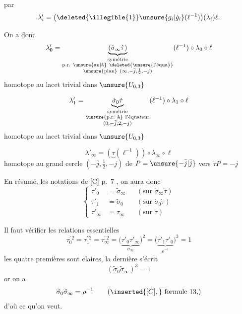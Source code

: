  par
\[
\lambda'_i=
\bigl(\deleted{\illegible{1}}\unsure{g_i|\dot g_i}(\ell^{-1})\bigr)
(\lambda_i)\ell.
\]

On a donc
\[
\lambda'_0=
\underbrace{(\dot\sigma_\infty\dot\tau)}_{
\substack{\text{symétrie}\\
\text{p.r. }\unsure{\text{au}|\text{à}}\ \deleted{\unsure{\text{l'équa}}}\\
\unsure{\text{plan}}\ (\infty,-\bar j,\frac12,-j)}}
(\ell^{-1})\circ\lambda_0\circ\ell
\]
 homotope au lacet trivial dans
$\unsure{U_{0,3}}$

\[
\lambda'_1=
\underbrace{\dot\sigma_0\dot\tau}_{
\substack{\text{symétrie}\\
\unsure{\text{p.r. à}}\ \text{l'équateur}\\
(0,-\bar j,2,-j)}}
(\ell^{-1})\circ\lambda_1\circ\ell
\]
homotope au lacet trivial dans $\unsure{U_{0,3}}$

\[
\lambda'_\infty=(\underbrace{\tau}(\ell^{-1}))\circ\lambda_\infty\circ\ell
\]
homotope au  
grand cercle $(-\bar j,\frac12,-j)$
de $P=\unsure{-\bar j|\bar j}$ vers $\dot\tau P=-j$



En résumé,  les notations de [C]  p.~7 , on aura donc
\[
\left\{
\begin{aligned}
\tau'_0&=\widetilde{\sigma}_\infty &&(\text{sur }\dot{\sigma}_\infty\dot{\tau})\\
\tau'_1&=\widetilde{\sigma}_0 &&(\text{sur }\dot{\sigma}_0\dot{\tau})\\
\tau'_\infty&=\tau_\infty &&(\text{sur }\dot{\tau})
\end{aligned}
\right.
\tag{22}
\]

Il faut vérifier les relations essentielles
\[
\tau_0^{\prime\,2}=\tau_1^{\prime\,2}=\tau_\infty^{\prime\,2}
=\bigl(\underbrace{\tau'_0\tau'_\infty}_{\sigma_\infty}\bigr)^2
=\bigl(\underbrace{\tau'_1\tau'_0}_{\rho^{-1}}\bigr)^3=1
\tag{23}
\]
les quatre premières sont claires, la dernière s'écrit
\[
(\widetilde{\sigma}_0\widetilde{\sigma}_\infty)^3=1
\]
or on a
\[
\widetilde{\sigma}_0\widetilde{\sigma}_\infty=\rho^{-1}
\qquad (\inserted{[C],}\ \text{formule 13,})
\]
d'où ce qu'on veut.

